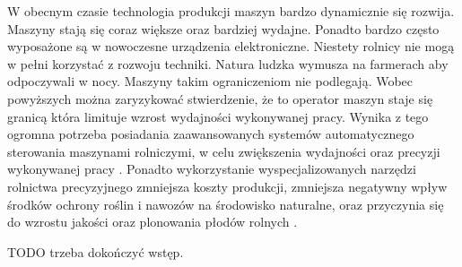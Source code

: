 %
W obecnym czasie technologia produkcji maszyn bardzo dynamicznie się rozwija. 
Maszyny stają się coraz większe oraz bardziej wydajne. 
Ponadto bardzo często wyposażone są w nowoczesne urządzenia elektroniczne. 
Niestety rolnicy nie mogą w pełni korzystać z rozwoju techniki. 
Natura ludzka wymusza na farmerach aby odpoczywali w nocy. Maszyny takim ograniczeniom nie podlegają.
Wobec powyższych można zaryzykować stwierdzenie, że to operator maszyn staje się granicą która limituje wzrost wydajności wykonywanej pracy.
Wynika z tego ogromna potrzeba posiadania zaawansowanych systemów automatycznego sterowania maszynami rolniczymi,
w celu zwiększenia wydajności oraz precyzji wykonywanej pracy \cite{CCTA_769_775}. 
Ponadto wykorzystanie wyspecjalizowanych narzędzi rolnictwa precyzyjnego zmniejsza koszty produkcji,
zmniejsza negatywny wpływ środków ochrony roślin i nawozów na środowisko naturalne, 
oraz przyczynia się do wzrostu jakości oraz plonowania płodów rolnych \cite{CCTA_943_950}.

TODO trzeba dokończyć wstęp.

